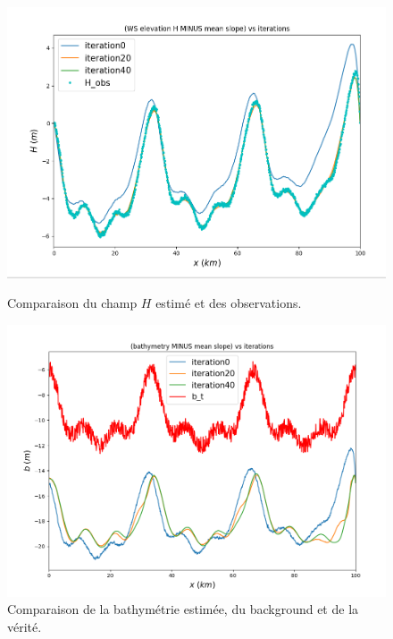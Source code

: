 \documentclass{article}
\begin{document}
\begin{figure}[H]
    \vspace{0.5cm}
    
    \begin{minipage}[b]{0.48\linewidth}
        \centering
        \includegraphics[width=\linewidth]{Images_Ayoub/With_Regularisation/Gradient/H_Comparaison.png}
        \caption{Comparaison du champ \(H\) estimé et des observations.}
        \label{fig:dec-h}
    \end{minipage}
    \hfill
    \begin{minipage}[b]{0.48\linewidth}
        \centering
        \includegraphics[width=\linewidth]{Images_Ayoub/With_Regularisation/Gradient/b_Comparaison.png}
        \caption{Comparaison de la bathymétrie estimée, du background et de la vérité.}
        \label{fig:dec-b}
    \end{minipage}
    

\end{figure}
\end{document}
